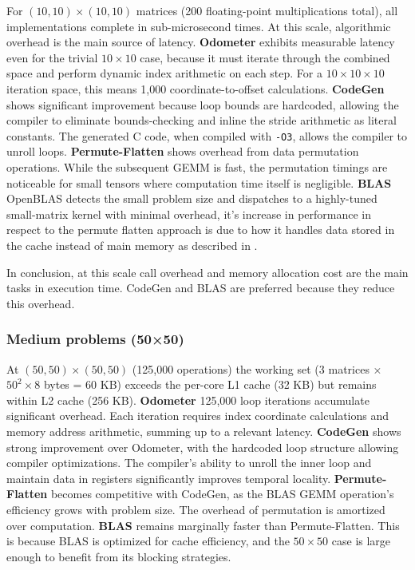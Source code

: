 \documentclass[binding=0.6cm]{sapthesis}
\begin{document}
For $(10, 10) \times (10, 10)$ matrices (200 floating-point multiplications total), all implementations complete in sub-microsecond times. At this scale, algorithmic overhead is the main source of latency.
\textbf {Odometer} exhibits measurable latency even for the trivial $10 \times 10$ case, because it must iterate through the combined space and perform dynamic index arithmetic on each step. For a $10 \times 10 \times 10$ iteration space, this means 1,000 coordinate-to-offset calculations.
\textbf {CodeGen} shows significant improvement because loop bounds are hardcoded, allowing the compiler to eliminate bounds-checking and inline the stride arithmetic as literal constants. The generated C code, when compiled with \texttt{-O3}, allows the compiler to unroll loops.
\textbf {Permute-Flatten} shows overhead from data permutation operations. While the subsequent GEMM is fast, the permutation timings are noticeable for small tensors where computation time itself is negligible.
\textbf {BLAS} OpenBLAS detects the small problem size and dispatches to a highly-tuned small-matrix kernel with minimal overhead, it's increase in performance in respect to the permute flatten approach is due to how it handles data stored in the cache instead of main memory as described in \cite{DONGARRA2017495}.


In conclusion, at this scale call overhead and memory allocation cost are the main tasks in execution time. CodeGen and BLAS are preferred because they reduce this overhead.

\subsubsection{Medium problems (50×50)}

At $(50, 50) \times (50, 50)$ (125,000 operations) the working set (3 matrices × $50^2 \times 8$ bytes = 60 KB) exceeds the per-core L1 cache (32 KB) but remains within L2 cache (256 KB). \textbf {Odometer} 125,000 loop iterations accumulate significant overhead. Each iteration requires index coordinate calculations and memory address arithmetic, summing up to a relevant latency.
\textbf {CodeGen} shows strong improvement over Odometer, with the hardcoded loop structure allowing compiler optimizations. The compiler's ability to unroll the inner loop and maintain data in registers significantly improves temporal locality.
\textbf {Permute-Flatten} becomes competitive with CodeGen, as the BLAS GEMM operation's efficiency grows with problem size. The overhead of permutation is amortized over computation.
\textbf {BLAS} remains marginally faster than Permute-Flatten. This is because BLAS is optimized for cache efficiency, and the $50 \times 50$ case is large enough to benefit from its blocking strategies.
\end{document}
